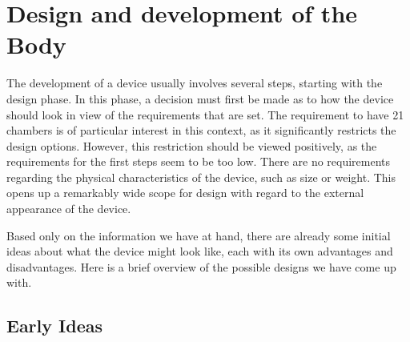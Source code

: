 \section{Design and development of the Body}\label{sec:Bodydesign}
The development of a device usually involves several steps, starting with the design phase. In this phase, a decision must first be made as to how the device should look in view of the requirements that are set. The requirement to have 21 chambers is of particular interest in this context, as it significantly restricts the design options. However, this restriction should be viewed positively, as the requirements for the first steps seem to be too low. There are no requirements regarding the physical characteristics of the device, such as size or weight. This opens up a remarkably wide scope for design with regard to the external appearance of the device.

Based only on the information we have at hand, there are already some initial ideas about what the device might look like, each with its own advantages and disadvantages. Here is a brief overview of the possible designs we have come up with.

\subsection{Early Ideas}
